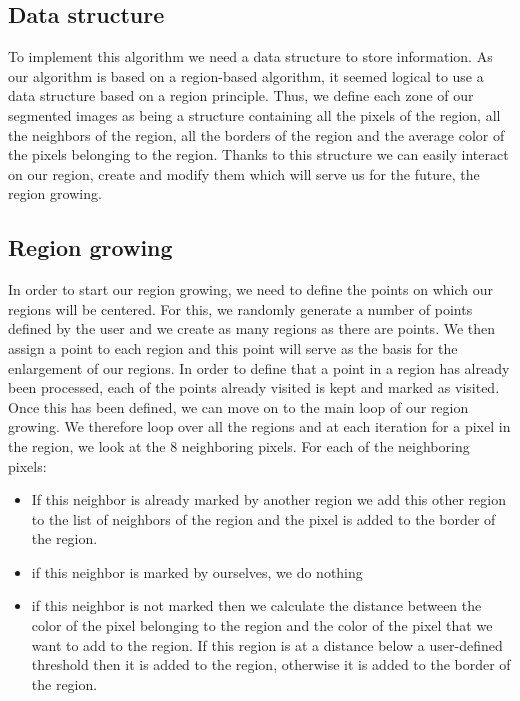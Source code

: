 \documentclass[conference]{IEEEtran}
\begin{document}
\subsection{Data structure}

To implement this algorithm we need a data structure to store information. As our algorithm is based on a region-based algorithm, it seemed logical to use a data structure based on a region principle. Thus, we define each zone of our segmented images as being a structure containing all the pixels of the region, all the neighbors of the region, all the borders of the region and the average color of the pixels belonging to the region. 
Thanks to this structure we can easily interact on our region, create and modify them which will serve us for the future, the region growing.

\subsection{Region growing}

In order to start our region growing, we need to define the points on which our regions will be centered. For this, we randomly generate a number of points defined by the user and we create as many regions as there are points. We then assign a point to each region and this point will serve as the basis for the enlargement of our regions. In order to define that a point in a region has already been processed, each of the points already visited is kept and marked as visited. 
Once this has been defined, we can move on to the main loop of our region growing. We therefore loop over all the regions and at each iteration for a pixel in the region, we look at the 8 neighboring pixels. For each of the neighboring pixels: 
\begin{itemize}
\item If this neighbor is already marked by another region we add this other region to the list of neighbors of the region and the pixel is added to the border of the region.
\item if this neighbor is marked by ourselves, we do nothing 
\item if this neighbor is not marked then we calculate the distance between the color of the pixel belonging to the region and the color of the pixel that we want to add to the region. If this region is at a distance below a user-defined threshold then it is added to the region, otherwise it is added to the border of the region.
\end{itemize}
\end{document}
